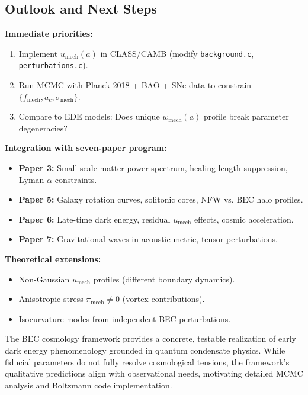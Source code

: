 \documentclass[11pt,a4paper]{article}
\newcommand{\umech}{\ensuremath{u_{\mathrm{mech}}}}
\newcommand{\wmech}{\ensuremath{w_{\mathrm{mech}}}}
\newcommand{\fmech}{\ensuremath{f_{\mathrm{mech}}}}
\newcommand{\ac}{\ensuremath{a_c}}
\newcommand{\sigmamech}{\ensuremath{\sigma_{\mathrm{mech}}}}
\theoremstyle{definition}
\theoremstyle{remark}
\begin{document}
\subsection{Outlook and Next Steps}
\label{sec:outlook}

\textbf{Immediate priorities:}
\begin{enumerate}[leftmargin=*, itemsep=0.2em]
\item Implement $\umech(a)$ in CLASS/CAMB (modify \texttt{background.c}, \texttt{perturbations.c}).
\item Run MCMC with Planck 2018 + BAO + SNe data to constrain $\{\fmech, \ac, \sigmamech\}$.
\item Compare to EDE models: Does unique $\wmech(a)$ profile break parameter degeneracies?
\end{enumerate}

\textbf{Integration with seven-paper program:}
\begin{itemize}[leftmargin=*, itemsep=0.2em]
\item \textbf{Paper 3:} Small-scale matter power spectrum, healing length suppression, Lyman-$\alpha$ constraints.
\item \textbf{Paper 5:} Galaxy rotation curves, solitonic cores, NFW vs. BEC halo profiles.
\item \textbf{Paper 6:} Late-time dark energy, residual $\umech$ effects, cosmic acceleration.
\item \textbf{Paper 7:} Gravitational waves in acoustic metric, tensor perturbations.
\end{itemize}

\textbf{Theoretical extensions:}
\begin{itemize}[leftmargin=*, itemsep=0.2em]
\item Non-Gaussian $\umech$ profiles (different boundary dynamics).
\item Anisotropic stress $\pi_{\mathrm{mech}} \neq 0$ (vortex contributions).
\item Isocurvature modes from independent BEC perturbations.
\end{itemize}

The BEC cosmology framework provides a concrete, testable realization of early dark energy phenomenology grounded in quantum condensate physics. While fiducial parameters do not fully resolve cosmological tensions, the framework's qualitative predictions align with observational needs, motivating detailed MCMC analysis and Boltzmann code implementation.

\end{document}
